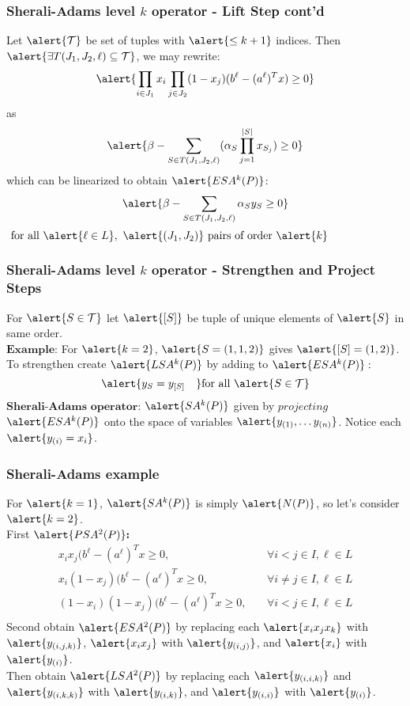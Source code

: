 \documentclass{beamer}
\begin{document}
\begin{frame}
\frametitle{Sherali-Adams level $k$ operator - Lift Step cont'd}
Let $\alert{\mathcal{T}}$ be set of tuples with $\alert{\leq k+1}$ indices. Then $\alert{\exists T(J_1,J_2,\ell) \subseteq \mathcal{T}}$, we may rewrite:
$$\alert{\prod_{i \in J_1} x_i \prod_{j \in J_2} (1 - x_j) (b^\ell - (a^\ell)^Tx) \geq 0}$$
as
$$ \alert{\beta - \sum_{S \in T(J_1, J_2,\ell)} (\alpha_S \prod_{j=1}^{|S|} x_{S_j}) \geq 0}$$
which can be linearized to obtain $\alert{ESA^k(P)}$:
$$\alert{\beta -\sum_{S \in T(J_1, J_2,\ell)} \alpha_S y_S \geq 0} $$
$\text{ for all } \alert{\ell \in L},\ \alert{(J_1, J_2)} \text{ pairs of order } \alert{k}$
\end{frame}

\begin{frame}
\frametitle{Sherali-Adams level $k$ operator - Strengthen and Project Steps}
For $\alert{S \in \mathcal{T}}$ let $\alert{[S]}$ be tuple of unique elements of $\alert{S}$ in same order.\\
$\textbf{Example:}$ For $\alert{k=2}$, $\alert{S = (1,1,2)}$ gives $\alert{[S] = (1,2)}$.\\
To strengthen create $\alert{LSA^k(P)}$ by adding to $\alert{ESA^k(P)}:$
$$\alert{y_S = y_{[S]} \quad} \text{for all } \alert{S \in \mathcal{T}}$$
$\textbf{Sherali-Adams operator:}$ $\alert{SA^k(P)}$ given by $\textit{projecting}$ $\alert{ESA^k(P)}$ onto the space of variables $\alert{y_{(1)} ,\dots y_{(n)}}$. Notice each $\alert{y_{(i)} = x_i}$.
\end{frame}

\begin{frame}
\frametitle{Sherali-Adams example}
For $\alert{k=1}$, $\alert{SA^k(P)}$ is simply $\alert{N(P)}$, so let's consider $\alert{k=2}$.\\
First $\alert{PSA^2(P)}\textbf{:}$
\alert{\begin{align*}
x_ix_j(b^\ell -(a^\ell)^Tx \geq 0,&\ &\forall i<j \in I, \ell \in L \\
x_i(1-x_j)(b^\ell -(a^\ell)^Tx \geq 0,&\ &\forall i\neq j \in I, \ell \in L \\
(1-x_i)(1-x_j)(b^\ell -(a^\ell)^Tx \geq 0,&\ &\forall i<j \in I, \ell \in L \\
\end{align*}}
Second obtain $\alert{ESA^2(P)}$ by replacing each $\alert{x_ix_jx_k}$ with $\alert{y_{(i,j,k)}}$, $\alert{x_ix_j}$ with $\alert{y_{(i,j)}}$, and $\alert{x_i}$ with $\alert{y_{(i)}}$.\\
Then obtain $\alert{LSA^2(P)}$ by replacing each $\alert{y_{(i,i,k)}}$ and $\alert{y_{(i,k,k)}}$ with $\alert{y_{(i,k)}}$, and $\alert{y_{(i,i)}}$ with $\alert{y_{(i)}}$.
\end{frame}
\end{document}

